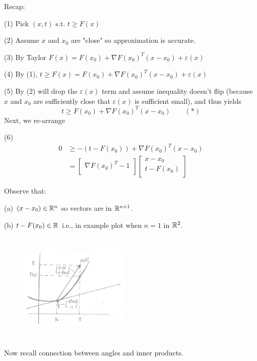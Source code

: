\vspace{0.5cm}
Recap:

(1) Pick $(x, t)$ s.t. $t \geq F(x)$
 
(2) Assume $x$ and $x_0$ are "close" so approximation is accurate.

(3) By Taylor
$F(x) = F(x_0) + \nabla F(x_0)^{T} (x-x_0) + \varepsilon(x)$

(4) By (1), $t \geq F(x) = F(x_0) + \nabla F(x_0)^{T} (x-x_0) + \varepsilon(x)$

(5) By (2) will drop the $\varepsilon(x)$ term and assume inequality doesn't flip (because $x$ and $x_0$ are sufficiently close that $\varepsilon(x)$ is sufficient small), and thus yields 
$$t \geq F(x_0) + \nabla F(x_0)^{T} (x-x_0)\qquad  (*)$$
Next, we re-arrange

(6)
\begin{align*}
0 &\geq -(t-F(x_0)) + \nabla F(x_0)^{T} (x - x_0) \\
&=\begin{bmatrix} \nabla F(x_0)^{T} -1\\ \end{bmatrix}  \begin{bmatrix} x-x_0\\ t-F(x_0)\\ \end{bmatrix} 
\end{align*}


Observe that:

(a) $(x-x_{0})\in \mathbb{R}^{n}$ so vectors are in $\mathbb{R}^{n+1}$.

(b) $t-F(x_{0})\in\mathbb{R}$ i.e., in example plot when $n=1$ in $\mathbb{R}^{2}$.

\begin{figure}
	\centering
	\includegraphics[width=2.1in,height=2.1in]{figures/ch02/p64.jpg}
\end{figure}

\vspace{0.5cm}
Now recall connection between angles and inner products.

